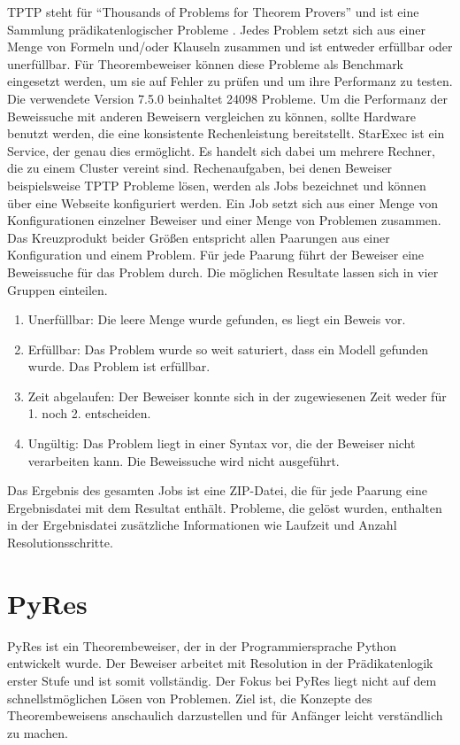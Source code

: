 TPTP steht für "`Thousands of Problems for Theorem Provers"' und ist eine Sammlung prädikatenlogischer Probleme \cite{Sutcliff2021TPTP}. Jedes Problem setzt sich aus einer Menge von Formeln und/oder Klauseln zusammen und ist entweder erfüllbar oder unerfüllbar. Für Theorembeweiser können diese Probleme als Benchmark eingesetzt werden, um sie auf Fehler zu prüfen und um ihre Performanz zu testen. Die verwendete Version 7.5.0 beinhaltet 24098 Probleme.
Um die Performanz der Beweissuche mit anderen Beweisern vergleichen zu können, sollte Hardware benutzt werden, die eine konsistente Rechenleistung bereitstellt. StarExec ist ein Service, der genau dies ermöglicht. Es handelt sich dabei um mehrere Rechner, die zu einem Cluster vereint sind. \cite{Sutcliff2022StarExec}
 Rechenaufgaben, bei denen Beweiser beispielsweise TPTP Probleme lösen, werden als Jobs bezeichnet und können über eine Webseite konfiguriert werden. Ein Job setzt sich aus einer Menge von Konfigurationen einzelner Beweiser und einer Menge von Problemen zusammen. Das Kreuzprodukt beider Größen entspricht allen Paarungen aus einer Konfiguration und einem Problem. Für jede Paarung führt der Beweiser eine Beweissuche für das Problem durch. Die möglichen Resultate lassen sich in vier Gruppen einteilen. 
\begin{enumerate}
	\item Unerfüllbar: Die leere Menge wurde gefunden, es liegt ein Beweis vor.
	\item Erfüllbar: Das Problem wurde so weit saturiert, dass ein Modell gefunden wurde. Das Problem ist erfüllbar.
	\item Zeit abgelaufen: Der Beweiser konnte sich in der zugewiesenen Zeit weder für 1. noch 2. entscheiden.
	\item Ungültig: Das Problem liegt in einer Syntax vor, die der Beweiser nicht verarbeiten kann. Die Beweissuche wird nicht ausgeführt.
\end{enumerate}
Das Ergebnis des gesamten Jobs ist eine ZIP-Datei, die für jede Paarung eine Ergebnisdatei mit dem Resultat enthält. Probleme, die gelöst wurden, enthalten in der Ergebnisdatei zusätzliche Informationen wie Laufzeit und Anzahl Resolutionsschritte.


	\section{PyRes}
PyRes ist ein Theorembeweiser, der in der Programmiersprache Python entwickelt wurde. Der Beweiser arbeitet mit Resolution in der Prädikatenlogik erster Stufe und ist somit vollständig. Der Fokus bei PyRes liegt nicht auf dem schnellstmöglichen Lösen von Problemen. Ziel ist, die Konzepte des Theorembeweisens anschaulich darzustellen und für Anfänger leicht verständlich zu machen. \cite{Schulz2020PyRes}

